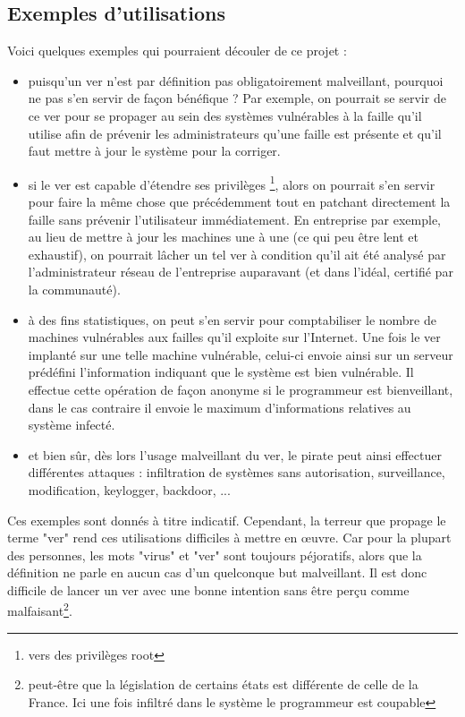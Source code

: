 \documentclass[]{projet-M1}
\begin{document}
\subsection{Exemples d'utilisations}
Voici quelques exemples qui pourraient découler de ce projet : 
\begin{itemize}
\item puisqu'un ver n'est par définition pas obligatoirement malveillant, pourquoi ne pas s'en servir de façon bénéfique ? Par exemple, on pourrait se servir de ce ver pour se propager au sein des systèmes vulnérables à la \gls{faille} qu'il utilise afin de prévenir les administrateurs qu'une \gls{faille} est présente et qu'il faut mettre à jour le système pour la  corriger.
\item si le ver est capable d'étendre ses privilèges \footnote{vers des privilèges root}, alors on pourrait s'en servir pour faire la même chose que précédemment tout en patchant directement la \gls{faille} sans prévenir l'utilisateur immédiatement. En entreprise par exemple, au lieu de mettre à jour les machines une à une (ce qui peu être lent et exhaustif), on pourrait lâcher un tel ver à condition qu'il ait été analysé par l'administrateur réseau de l'entreprise auparavant (et dans l'idéal, certifié par la communauté).
\item à des fins statistiques, on peut s'en servir pour comptabiliser le nombre de machines vulnérables aux \glspl{faille} qu'il exploite sur l'Internet. Une fois le ver implanté sur une telle machine vulnérable, celui-ci envoie ainsi sur un serveur prédéfini l'information indiquant que le système est bien vulnérable. Il effectue cette opération de façon anonyme si le programmeur est bienveillant, dans le cas contraire il envoie le maximum d'informations relatives au système infecté.  
\item et bien sûr, dès lors l'usage malveillant du ver, le pirate peut ainsi effectuer différentes attaques : infiltration de systèmes sans autorisation, surveillance, modification, \gls{keylogger}, \gls{backdoor}, ...
\end{itemize}

Ces exemples sont donnés à titre indicatif. Cependant, la terreur que propage le terme "ver" rend ces utilisations difficiles à mettre en œuvre. Car pour la plupart des personnes, les mots "virus" et "ver" sont toujours péjoratifs, alors que la définition ne parle en aucun cas d'un quelconque but malveillant. Il est donc difficile de lancer un ver avec une bonne intention sans être perçu comme malfaisant\footnote{peut-être que la législation de certains états est différente de celle de la France. Ici une fois infiltré dans le système le programmeur est coupable}.
\end{document}
